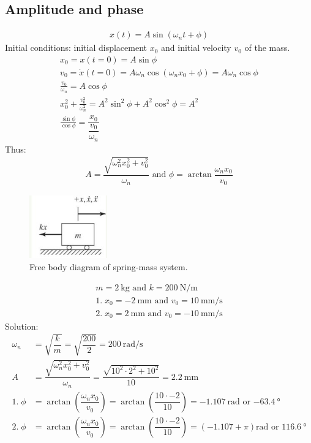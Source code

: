 \subsection{Amplitude and phase}
\begin{gather}
    x(t) = A \sin\left(\omega_n t + \phi\right)
\end{gather}
Initial conditions: initial displacement $x_0$ and initial velocity $v_0$ of the mass.
\begin{gather}
    x_0 = x(t = 0) = A\sin \phi\\
    v_0 = \dot{x} (t=0) = A\omega_n \cos\left(\omega_n x_0 + \phi\right) = A \omega_n \cos \phi\\
    \frac{v_0}{\omega_n} = A \cos \phi\\
    x_0^2 + \frac{v_0^2}{\omega_n^2} = A^2 \sin^2 \phi + A^2 \cos^2 \phi = A^2\\
    \frac{\sin \phi}{\cos \phi} = \dfrac{x_0}{\dfrac{v_0}{\omega_n}}
\end{gather}
Thus:
\begin{gather}
    A = \dfrac{\sqrt{\omega_n^2 x_0^2 + v_0^2}}{\omega_n} \textrm{ and } \phi = \arctan{\dfrac{\omega_n x_0}{v_0}}
\end{gather}
\begin{figure}[H]
    \centering
    \includegraphics[width = 0.3\textwidth]{./img/diagram2.jpg}
    \caption{Free body diagram of spring-mass system.}
\end{figure}
\begin{gather}
    m = \SI{2}{\kg} \textrm{ and } k = \SI{200}{\newton\per\meter}\\
    1. \; x_0 = \SI{-2}{\milli\meter} \textrm{ and } v_0 = \SI{10}{\milli\meter\per\second}\\
    2. \; x_0 = \SI{2}{\milli\meter} \textrm{ and } v_0 = \SI{-10}{\milli\meter\per\second}
\end{gather}
Solution:
\begin{align}
    \omega_n   & = \sqrt{\dfrac{k}{m}} = \sqrt{\dfrac{200}{2}} = \SI{200}{\radian\per\second}                                                                                        \\
    A          & = \dfrac{\sqrt{\omega_n^2 x_0^2 + v_0^2}}{\omega_n} = \dfrac{\sqrt{10^2 \cdot 2^2 + 10^2}}{10} = \SI{2.2}{\milli\meter}                                             \\
    1. \; \phi & = \arctan\left(\dfrac{\omega_n x_0}{v_0}\right) = \arctan\left(\dfrac{10\cdot-2}{10}\right) = \SI{-1.107}{\radian} \textrm{ or } \SI{-63.4}{\degree}                \\
    2. \; \phi & = \arctan\left(\dfrac{\omega_n x_0}{v_0}\right) = \arctan\left(\dfrac{10\cdot-2}{10}\right) = \left(-1.107+\pi\right)\si{\radian} \textrm{ or } \SI{116.6}{\degree}
\end{align}
